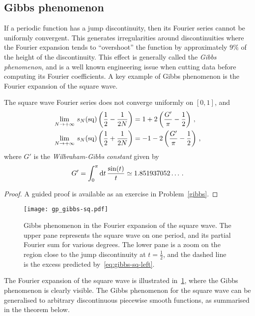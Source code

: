 \subsection{Gibbs phenomenon}
If a periodic function has a jump discontinuity, then its Fourier series cannot be uniformly
convergent. This generates irregularities around discontinuities where the Fourier expansion tends to ``overshoot'' the function by approximately $9\%$ of the height of the discontinuity. This effect is generally called the \emph{Gibbs phenomenon}, and is a well known engineering issue when cutting data before computing its Fourier coefficients.
A key example of Gibbs phenomenon is the Fourier expansion of the square wave.
\begin{lemma}
  \label{lem:gibbs-sq}
  The square wave Fourier series does not converge uniformly on $[0,1]$, and
  \begin{align}
    \lim_{N\to+\infty}\,s_N(\operatorname{sq})\left(\frac12-\frac{1}{2N}\right)
    &=1+2\left(\frac{G'}{\pi}-\frac12\right)\,,\label{eq:gibbs-sq-left}\\
    \lim_{N\to+\infty}\,s_N(\operatorname{sq})\left(\frac12+\frac{1}{2N}\right)
    &=-1-2\left(\frac{G'}{\pi}-\frac12\right)\,,
  \end{align}
  where $G'$ is the \emph{Wilbraham-Gibbs constant} given by
  \begin{equation}
    G'=\int_0^\pi\mathrm{d} t\,\frac{\sin(t)}{t}\simeq1.851937052\dots\,.
  \end{equation}
\end{lemma}
\begin{proof}
  A guided proof is available as an exercise in Problem~\ref{gibbs}.
\end{proof}
\begin{figure}[t]
  \centering
  \texttt{[image: gp\_gibbs-sq.pdf]}
  \caption{Gibbs phenomenon in the Fourier expansion of the square wave. The upper pane represents the square wave on one period, and its partial Fourier sum for various degrees. The lower pane is a zoom on the region close to the jump discontinuity at $t=\frac12$, and the dashed line is the excess predicted by~\cref{eq:gibbs-sq-left}.}
  \label{fig:gibbs-sq}
\end{figure}
The Fourier expansion of the square wave is illustrated in~\cref{fig:gibbs-sq}, where the Gibbs phenomenon is clearly visible. The Gibbs phenomenon for the square wave can be generalised to arbitrary discontinuous piecewise smooth functions, as summarised in the theorem below.
